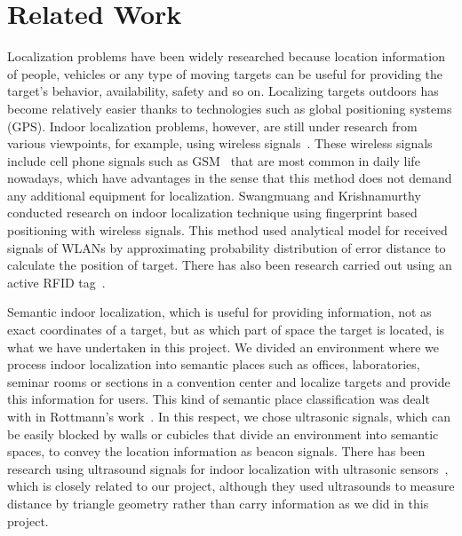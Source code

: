 \section{Related Work}
\label{sec:related-works}


Localization problems have been widely researched because location information of people, vehicles or any type of moving targets can be useful for providing the target's behavior, availability, safety and so on. Localizing targets outdoors has become relatively easier thanks to technologies such as global positioning systems (GPS). Indoor localization problems, however, are still under research from various viewpoints, for example, using wireless signals~\cite{liu2007}. These wireless signals include cell phone signals such as GSM~\cite{otsason2005accurate} that are most common in daily life nowadays, which have advantages in the sense that this method does not demand any additional equipment for localization. Swangmuang and Krishnamurthy~\cite{Swangmuang2008} conducted research on indoor localization technique using fingerprint based positioning with wireless signals. This method used analytical model for received signals of WLANs by approximating probability distribution of error distance to calculate the position of target. There has also been research carried out using an active RFID tag~\cite{Jin2006}.

Semantic indoor localization, which is useful for providing information, not as exact coordinates of a target, but as which part of space the target is located, is what we have undertaken in this project. We divided an environment where we process indoor localization into semantic places such as offices, laboratories, seminar rooms or sections in a convention center and localize targets and provide this information for users. This kind of semantic place classification was dealt with in Rottmann's work~\cite{rottmann2005semantic}. In this respect, we chose ultrasonic signals, which can be easily blocked by walls or cubicles that divide an environment into semantic spaces, to convey the location information as beacon signals. There has been research using ultrasound signals for indoor localization with ultrasonic sensors~\cite{feng1997mobile}, which is closely related to our project, although they used ultrasounds to measure distance by triangle geometry rather than carry information as we did in this project.



